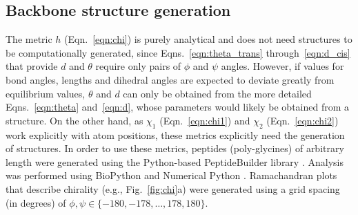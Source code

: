 \documentclass[fleqn,10pt,lineno]{wlpeerj} %
\newcommand{\n}[1]{{\color{black}#1}} %
\newcommand{\Fig}[1]{Fig.~\ref{#1}}
\newcommand{\Eqn}[1]{Eqn.~\ref{#1}}
\newcommand{\Eqns}[1]{Eqns.~\ref{#1}}
\newcommand{\h}{h}
\begin{document}
\subsection*{\n{Backbone structure generation}}
\n{The metric $\h$ (\Eqn{eqn:chi})} is purely analytical and does not need structures to be computationally generated\n{, since \Eqns{eqn:theta_trans} through~\ref{eqn:d_cis} that provide $d$ and $\theta$ require only pairs of $\phi$ and $\psi$ angles. However, if values for bond angles, lengths and dihedral angles are expected to deviate greatly from equilibrium values, $\theta$ and $d$ can only be obtained from the more detailed \Eqns{eqn:theta} and~\ref{eqn:d}, whose parameters would likely be obtained from a structure. On the other hand, as $\chi_1$ (\Eqn{eqn:chi1}) and $\chi_2$ (\Eqn{eqn:chi2}) work explicitly with atom positions, these metrics explicitly need the generation of structures.} In order to use these metrics, peptides (poly-glycines) of arbitrary length were generated using the Python-based PeptideBuilder library \citep{Tien2013}. 
Analysis was performed using BioPython \citep{Cock2009} and Numerical Python \citep{VanDerWalt2011}. Ramachandran plots that describe chirality (e.g., \Fig{fig:chi}a) were generated using a grid spacing (in degrees) of $\phi,\psi \in \{-180,-178,\ldots,178,180\}$.
\end{document}
